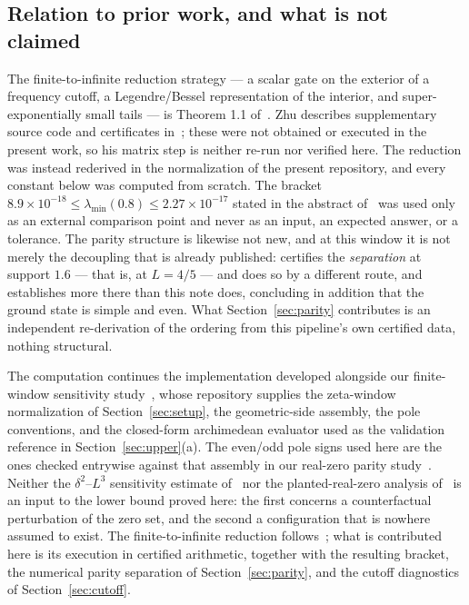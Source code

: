 \documentclass[11pt,a4paper]{article}
\theoremstyle{definition}
\theoremstyle{remark}
\begin{document}
\subsection{Relation to prior work, and what is not claimed}
\label{sec:prior}

The finite-to-infinite reduction strategy --- a scalar gate on the exterior of a
frequency cutoff, a Legendre/Bessel representation of the interior, and
super-exponentially small tails --- is Theorem 1.1 of~\cite{Zhu}. Zhu describes
supplementary source code and certificates in~\cite[\S17]{Zhu}; these were not
obtained or executed in the present work, so his matrix step is neither re-run
nor verified here. The reduction was instead rederived in the normalization of
the present repository, and every constant below was computed from scratch. The bracket $8.9\times10^{-18} \le \lambda_{\min}(0.8) \le
2.27\times10^{-17}$ stated in the abstract of~\cite{Zhu} was used only as an
external comparison point and never as an input, an expected answer, or a
tolerance. The parity structure is likewise not new, and at this window it is
not merely the decoupling that is already published: \cite[Thm.~6.2]{Zhu}
certifies the \emph{separation} at support $1.6$ --- that is, at $L = 4/5$ --- and
does so by a different route, and establishes more there than this note does,
concluding in addition that the ground state is simple and even. What
Section~\ref{sec:parity} contributes is an independent re-derivation of the
ordering from this pipeline's own certified data, nothing structural.

The computation continues the implementation developed alongside our
finite-window sensitivity study~\cite{Sensitivity}, whose repository supplies the
zeta-window normalization of Section~\ref{sec:setup}, the geometric-side
assembly, the pole conventions, and the closed-form archimedean evaluator used
as the validation reference in Section~\ref{sec:upper}(a). The even/odd pole
signs used here are the ones checked entrywise against that assembly in our
real-zero parity study~\cite{ParityNote}. Neither the $\delta^2$--$L^3$
sensitivity estimate of~\cite{Sensitivity} nor the planted-real-zero analysis
of~\cite{ParityNote} is an input to the lower bound proved here: the first
concerns a counterfactual perturbation of the zero set, and the second a
configuration that is nowhere assumed to exist. The finite-to-infinite reduction
follows~\cite{Zhu}; what is contributed here is its execution in certified
arithmetic, together with the resulting bracket, the numerical parity separation
of Section~\ref{sec:parity}, and the cutoff diagnostics of
Section~\ref{sec:cutoff}.
\end{document}
